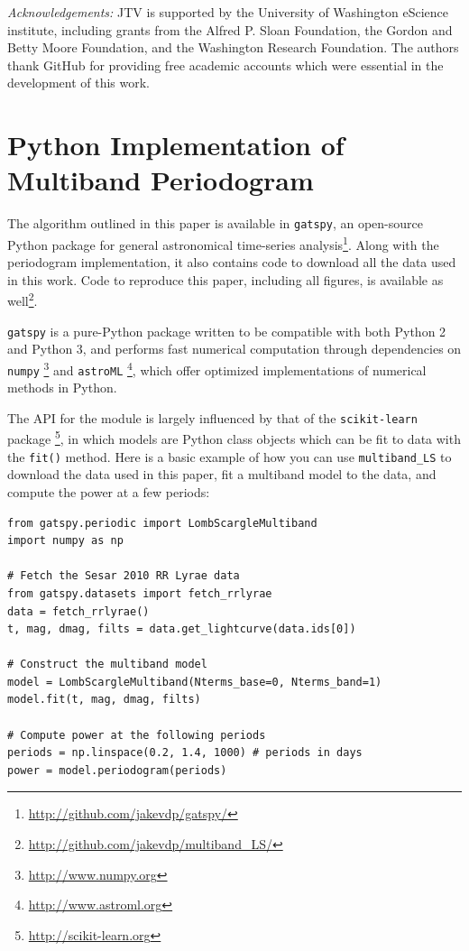 \documentclass[12pt,preprint]{aastex}
\newcommand{\sectlabel}[1]{\label{sect:#1}}
\begin{document}
{\it Acknowledgements:} JTV is supported by the University of Washington eScience institute, including grants from the Alfred P. Sloan Foundation, the Gordon and Betty Moore Foundation, and the Washington Research Foundation. The authors thank GitHub for providing free academic accounts which were essential in the development of this work.





\appendix
\section{Python Implementation of Multiband Periodogram}
\sectlabel{gatspy}
The algorithm outlined in this paper is available in {\tt gatspy}, an open-source Python package for general astronomical time-series analysis\footnote{\url{http://github.com/jakevdp/gatspy/}}. Along with the periodogram implementation, it also contains code to download all the data used in this work. Code to reproduce this paper, including all figures, is available as well\footnote{\url{http://github.com/jakevdp/multiband_LS/}}.

{\tt gatspy} is a pure-Python package written to be compatible with both Python 2 and Python 3, and performs fast numerical computation through dependencies on {\tt numpy} \citep{numpy}\footnote{\url{http://www.numpy.org}} and {\tt astroML} \citep{astroML}\footnote{\url{http://www.astroml.org}}, which offer optimized implementations of numerical methods in Python.

The API for the module is largely influenced by that of the {\tt scikit-learn} package \citep{scikit-learn, sklearn_API}\footnote{\url{http://scikit-learn.org}}, in which models are Python class objects which can be fit to data with the \texttt{fit()} method.
Here is a basic example of how you can use {\tt multiband\_LS} to download the data used in this paper, fit a multiband model to the data, and compute the power at a few periods:

\begin{lstlisting}
from gatspy.periodic import LombScargleMultiband
import numpy as np

# Fetch the Sesar 2010 RR Lyrae data
from gatspy.datasets import fetch_rrlyrae
data = fetch_rrlyrae()
t, mag, dmag, filts = data.get_lightcurve(data.ids[0])

# Construct the multiband model
model = LombScargleMultiband(Nterms_base=0, Nterms_band=1)
model.fit(t, mag, dmag, filts)

# Compute power at the following periods
periods = np.linspace(0.2, 1.4, 1000) # periods in days
power = model.periodogram(periods)
\end{lstlisting}
\end{document}
